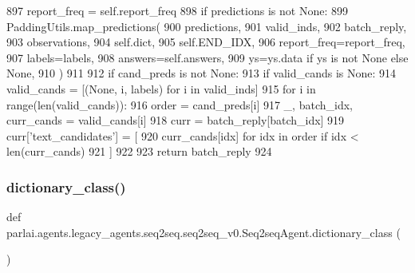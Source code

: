 \begin{DoxyCode}
897             report\_freq = self.report\_freq
898         \textcolor{keywordflow}{if} predictions \textcolor{keywordflow}{is} \textcolor{keywordflow}{not} \textcolor{keywordtype}{None}:
899             PaddingUtils.map\_predictions(
900                 predictions,
901                 valid\_inds,
902                 batch\_reply,
903                 observations,
904                 self.dict,
905                 self.END\_IDX,
906                 report\_freq=report\_freq,
907                 labels=labels,
908                 answers=self.answers,
909                 ys=ys.data \textcolor{keywordflow}{if} ys \textcolor{keywordflow}{is} \textcolor{keywordflow}{not} \textcolor{keywordtype}{None} \textcolor{keywordflow}{else} \textcolor{keywordtype}{None},
910             )
911 
912         \textcolor{keywordflow}{if} cand\_preds \textcolor{keywordflow}{is} \textcolor{keywordflow}{not} \textcolor{keywordtype}{None}:
913             \textcolor{keywordflow}{if} valid\_cands \textcolor{keywordflow}{is} \textcolor{keywordtype}{None}:
914                 valid\_cands = [(\textcolor{keywordtype}{None}, i, labels) \textcolor{keywordflow}{for} i \textcolor{keywordflow}{in} valid\_inds]
915             \textcolor{keywordflow}{for} i \textcolor{keywordflow}{in} range(len(valid\_cands)):
916                 order = cand\_preds[i]
917                 \_, batch\_idx, curr\_cands = valid\_cands[i]
918                 curr = batch\_reply[batch\_idx]
919                 curr[\textcolor{stringliteral}{'text\_candidates'}] = [
920                     curr\_cands[idx] \textcolor{keywordflow}{for} idx \textcolor{keywordflow}{in} order \textcolor{keywordflow}{if} idx < len(curr\_cands)
921                 ]
922 
923         \textcolor{keywordflow}{return} batch\_reply
924 
\end{DoxyCode}
\mbox{\label{classparlai_1_1agents_1_1legacy__agents_1_1seq2seq_1_1seq2seq__v0_1_1Seq2seqAgent_a05552a2714cd8d15d754a62258727c98}} 
\subsubsection{\texorpdfstring{dictionary\+\_\+class()}{dictionary\_class()}}
{\footnotesize\ttfamily def parlai.\+agents.\+legacy\+\_\+agents.\+seq2seq.\+seq2seq\+\_\+v0.\+Seq2seq\+Agent.\+dictionary\+\_\+class (\begin{DoxyParamCaption}{ }\end{DoxyParamCaption})\hspace{0.3cm}{\ttfamily [static]}}



